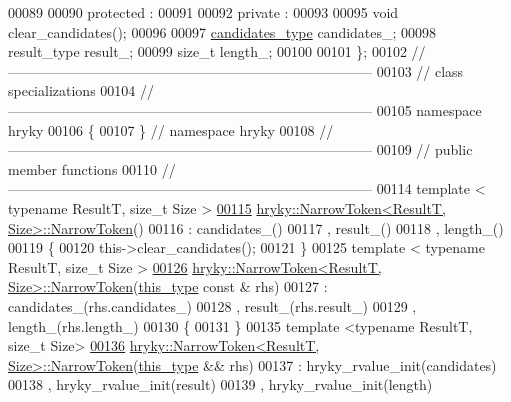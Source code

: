 \begin{DoxyCode}
00089 
00090 \textcolor{keyword}{protected} :
00091 
00092 \textcolor{keyword}{private} :
00093 
00095     \textcolor{keywordtype}{void} clear\_candidates();
00096 
00097     \hyperlink{classhryky_1_1_fixed_vector}{candidates_type} candidates\_;
00098     result\_type     result\_;
00099     \textcolor{keywordtype}{size\_t}          length\_;
00100 
00101 \};
00102 \textcolor{comment}{//
      ------------------------------------------------------------------------------}
00103 \textcolor{comment}{// class specializations}
00104 \textcolor{comment}{//
      ------------------------------------------------------------------------------}
00105 \textcolor{keyword}{namespace }hryky
00106 \{
00107 \} \textcolor{comment}{// namespace hryky}
00108 \textcolor{comment}{//
      ------------------------------------------------------------------------------}
00109 \textcolor{comment}{// public member functions}
00110 \textcolor{comment}{//
      ------------------------------------------------------------------------------}
00114 \textcolor{comment}{}\textcolor{keyword}{template} < \textcolor{keyword}{typename} ResultT, \textcolor{keywordtype}{size\_t} Size >
\hypertarget{narrow__token_8h_source_l00115}{}\hyperlink{classhryky_1_1_narrow_token_a1ce8a8fce4830b8bdb73f9a4bb22a6ad}{00115} \hyperlink{classhryky_1_1_narrow_token_a1ce8a8fce4830b8bdb73f9a4bb22a6ad}{hryky::NarrowToken<ResultT, Size>::NarrowToken}()
00116     : candidates\_()
00117       , result\_()
00118       , length\_()
00119 \{
00120     this->clear\_candidates();
00121 \}
00125 \textcolor{keyword}{template} < \textcolor{keyword}{typename} ResultT, \textcolor{keywordtype}{size\_t} Size >
\hypertarget{narrow__token_8h_source_l00126}{}\hyperlink{classhryky_1_1_narrow_token_ad60e6cb2513b59434f85506aefd4db63}{00126} \hyperlink{classhryky_1_1_narrow_token}{hryky::NarrowToken<ResultT, Size>::NarrowToken}(\hyperlink{classhryky_1_1_narrow_token}{this_type} \textcolor{keyword}{const} & rhs)
00127     : candidates\_(rhs.candidates\_)
00128       , result\_(rhs.result\_)
00129       , length\_(rhs.length\_)
00130 \{
00131 \}
00135 \textcolor{keyword}{template} <\textcolor{keyword}{typename} ResultT, \textcolor{keywordtype}{size\_t} Size>
\hypertarget{narrow__token_8h_source_l00136}{}\hyperlink{classhryky_1_1_narrow_token_a708b7d695e675848be5e8f871a61ce3f}{00136} \hyperlink{classhryky_1_1_narrow_token}{hryky::NarrowToken<ResultT, Size>::NarrowToken}(\hyperlink{classhryky_1_1_narrow_token}{this_type} && rhs)
00137     : hryky\_rvalue\_init(candidates)
00138       , hryky\_rvalue\_init(result)
00139       , hryky\_rvalue\_init(length)

\end{DoxyCode}
